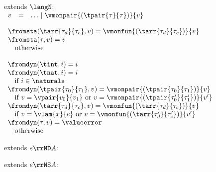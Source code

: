 \begin{flushleft}

\begin{minipage}[t]{0.5\textwidth}
 extends $\langN$:\\
$\begin{array}{l c l}
  v & = & \ldots \mid \vmonpair{(\tpair{\tau}{\tau})}{v}
\end{array}$

\medskip
$\begin{array}{l}
  \fromsta(\tarr{\tau_d}{\tau_c}, v) = \vmonfun{(\tarr{\tau_d}{\tau_c})}{v}
\\
  \fromsta(\tau, v) = v
\\ \mbox{\quad otherwise}
\end{array}$
\end{minipage}%
\begin{minipage}[t]{0.5\textwidth}
$\begin{array}{l}
  \fromdyn(\tint, i) = i
\\
  \fromdyn(\tnat, i) = i
\\ \mbox{\quad if $i \in \naturals$}
\\
  \fromdyn(\tpair{\tau_0}{\tau_1}, v) = \vmonpair{(\tpair{\tau_0}{\tau_1})}{v}
\\ \mbox{\quad if $v = \vpair{v_0}{v_1}$ or $v = \vmonpair{(\tpair{\tau_0'}{\tau_1'})}{v'}$}
\\
  \fromdyn(\tarr{\tau_d}{\tau_c}, v) = \vmonfun{(\tarr{\tau_d}{\tau_c})}{v}
\\ \mbox{\quad if $v = \vlam{x}{e}$ or $v = \vmonfun{(\tarr{\tau_d'}{\tau_c'})}{v'}$}
\\
  \fromdyn(\tau, v) = \valueerror
\\ \mbox{\quad otherwise}
\end{array}$
\end{minipage}


\medskip
\begin{minipage}[t]{0.5\textwidth}
 extends $e \rrND A$:
\begin{mathpar}

\end{mathpar}
\end{minipage}%
\begin{minipage}[t]{0.5\textwidth}
 extends $e \rrNS A$:
\begin{mathpar}


\end{mathpar}
\end{minipage}
\end{flushleft}
